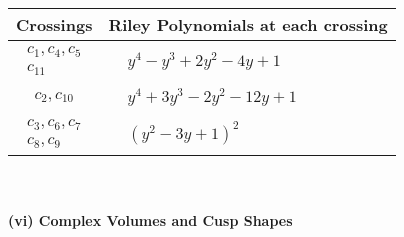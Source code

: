 \documentclass[1p]{elsarticle_modified}
\theoremstyle{definition}
\begin{document}
\begin{tabular}{m{50pt}|m{274pt}}
Crossings & \hspace{64pt}Riley Polynomials at each crossing \\
\hline $$\begin{aligned}c_{1},c_{4},c_{5}\\c_{11}\end{aligned}$$&$\begin{aligned}
&y^4- y^3+2 y^2-4 y+1
\end{aligned}$\\
\hline $$\begin{aligned}c_{2},c_{10}\end{aligned}$$&$\begin{aligned}
&y^4+3 y^3-2 y^2-12 y+1
\end{aligned}$\\
\hline $$\begin{aligned}c_{3},c_{6},c_{7}\\c_{8},c_{9}\end{aligned}$$&$\begin{aligned}
&(y^2-3 y+1)^2
\end{aligned}$\\
\hline
\end{tabular}\\~\\
\newpage\flushleft \textbf{(vi) Complex Volumes and Cusp Shapes}
\end{document}
